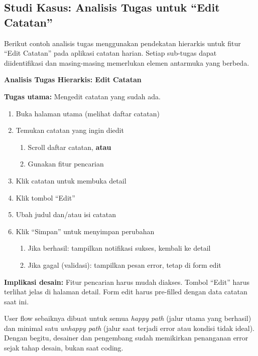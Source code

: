 \subsection{Studi Kasus: Analisis Tugas untuk ``Edit Catatan''}

Berikut contoh analisis tugas menggunakan pendekatan hierarkis untuk fitur ``Edit Catatan'' pada aplikasi catatan harian. Setiap sub-tugas dapat diidentifikasi dan masing-masing memerlukan elemen antarmuka yang berbeda.

\begin{contoh}
\textbf{Analisis Tugas Hierarkis: Edit Catatan}

\textbf{Tugas utama:} Mengedit catatan yang sudah ada.

\begin{enumerate}
  \item Buka halaman utama (melihat daftar catatan)
  \item Temukan catatan yang ingin diedit
  \begin{enumerate}
    \item Scroll daftar catatan, \textbf{atau}
    \item Gunakan fitur pencarian
  \end{enumerate}
  \item Klik catatan untuk membuka detail
  \item Klik tombol ``Edit''
  \item Ubah judul dan/atau isi catatan
  \item Klik ``Simpan'' untuk menyimpan perubahan
  \begin{enumerate}
    \item Jika berhasil: tampilkan notifikasi sukses, kembali ke detail
    \item Jika gagal (validasi): tampilkan pesan error, tetap di form edit
  \end{enumerate}
\end{enumerate}

\textbf{Implikasi desain:} Fitur pencarian harus mudah diakses. Tombol ``Edit'' harus terlihat jelas di halaman detail. Form edit harus pre-filled dengan data catatan saat ini.
\end{contoh}

\begin{catatan}
User flow sebaiknya dibuat untuk semua \textit{happy path} (jalur utama yang berhasil) dan minimal satu \textit{unhappy path} (jalur saat terjadi error atau kondisi tidak ideal). Dengan begitu, desainer dan pengembang sudah memikirkan penanganan error sejak tahap desain, bukan saat coding.
\end{catatan}

